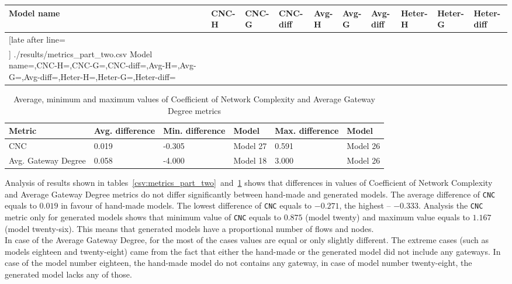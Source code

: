 \newpage
{\scriptsize
	\begin{longtable}{|p{0.09 \hsize}|p{0.07 \hsize}|p{0.07 \hsize}|p{0.08 \hsize}|p{0.07 \hsize}|p{0.07 \hsize}|p{0.08 \hsize}|p{0.07 \hsize}|p{0.07 \hsize}|p{0.07 \hsize}|}
		\hline
		Model name & CNC-H & CNC-G & CNC-diff & Avg-H & Avg-G & Avg-diff & Heter-H & Heter-G & Heter-diff
		\\\hline\hline
		\csvreader[late after line=\\\hline]
		{./results/metrics_part_two.csv}
		{Model name=\CA,CNC-H=\CB,CNC-G=\CC,CNC-diff=\CD,Avg-H=\CE,Avg-G=\CF,Avg-diff=\CG,Heter-H=\CH,Heter-G=\CI,Heter-diff=\CJ}
		{\CA & \CB & \CC & \CD & \CE & \CF & \CG & \CH & \CI & \CJ}
		\caption{Validation results -- Coefficient of Network Complexity, Average Gateway Degree and Gateway Heterogeneity metrics}
		\label{csv:metrics_part_two}
	\end{longtable}
}
\begin{table}[H]
	{\small
	\centering
	\begin{tabular}{|p{0.2 \hsize}|p{0.15 \hsize}|p{0.15 \hsize}|p{0.1 \hsize}|p{0.15 \hsize}|p{0.1 \hsize}|}
		\hline
		Metric & Avg. difference & Min. difference & Model & Max. difference & Model \\
		\hline
		CNC & 0.019 & -0.305 & Model 27 & 0.591 & Model 26 \\
		\hline
		Avg. Gateway Degree & 0.058 & -4.000 & Model 18 & 3.000 & Model 26 \\
		\hline
	\end{tabular}
	}
	\caption{Average, minimum and maximum values of Coefficient of Network Complexity and Average Gateway Degree metrics}
	\label{csv:cnc_avg_heter_max_min}
\end{table}
Analysis of results shown in tables~\ref{csv:metrics_part_two}~and~\ref{csv:cnc_avg_heter_max_min} shows that differences in values of Coefficient of Network Complexity and Average Gateway Degree metrics do not differ significantly between hand-made and generated models. The average difference of \texttt{CNC} equals to $ 0.019 $ in favour of hand-made models. The lowest difference of \texttt{CNC} equals to $ -0.271 $, the highest -- $ -0.333 $. Analysis the \texttt{CNC} metric only for generated models shows that minimum value of \texttt{CNC} equals to $ 0.875 $ (model twenty) and maximum value equals to $ 1.167 $ (model twenty-six). This means that generated models have a proportional number of flows and nodes.\\
In case of the Average Gateway Degree, for the most of the cases values are equal or only slightly different. The extreme cases (such as models eighteen and twenty-eight) came from the fact that either the hand-made or the generated model did not include any gateways. In case of the model number eighteen, the hand-made model do not contains any gateway, in case of model number twenty-eight, the generated model lacks any of those.\\

